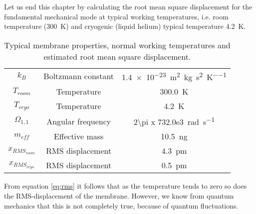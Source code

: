 Let us end this chapter by calculating the root mean square displacement for the fundamental mechanical mode at typical working temperatures, i.e. room temperature (\SI{300}{\kelvin}) and cryogenic (liquid helium) typical temperature \SI{4.2}{\kelvin}.

\begin{table}[H]
\centering
\begin{tabular}{ccc}
\toprule
$k_B$ & Boltzmann constant & \SI{1.4e-23}{\square\meter\kilogram\per\square\second\per\kelvin} \\
$T_{room}$ & Temperature & \SI{300.0}{\kelvin} \\
$T_{cryo}$ & Temperature & \SI{4.2}{\kelvin} \\
$\Omega_{1,1}$ & Angular frequency & \SI[product-units=single]{2\pi x 732.0e3}{\radian\per\second} \\
$m_{eff}$ & Effective mass & \SI{10.5}{\nano\gram} \\
\midrule
$x_{RMS_{room}}$ & RMS displacement & \SI{4.3}{\pico\meter} \\
$x_{RMS_{cryo}}$ & RMS displacement & \SI{0.5}{\pico\meter} \\
\bottomrule
\end{tabular}
\caption{Typical membrane properties, normal working temperatures and estimated root mean square displacement.}
\label{tab:RMS_displacement}
\end{table}

From equation \eqref{eq:rms} it follows that as the temperature tends to zero so does the RMS-displacement of the membrane. However, we know from quantum mechanics that this is not completely true, because of quantum fluctuations.
